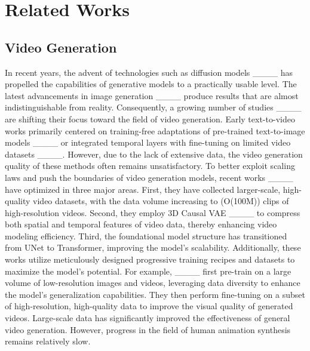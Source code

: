 \section{Related Works}
\subsection{Video Generation}
  In recent years, the advent of technologies such as diffusion models ____ has propelled the capabilities of generative models to a practically usable level. The latest advancements in image generation ____ produce results that are almost indistinguishable from reality. Consequently, a growing number of studies ____ are shifting their focus toward the field of video generation.
  Early text-to-video works primarily centered on training-free adaptations of pre-trained text-to-image models ____ or integrated temporal layers with fine-tuning on limited video datasets ____. However, due to the lack of extensive data, the video generation quality of these methods often remains unsatisfactory. To better exploit scaling laws and push the boundaries of video generation models, recent works ____ have optimized in three major areas. First, they have collected larger-scale, high-quality video datasets, with the data volume increasing to (O(100M)) clips of high-resolution videos. Second, they employ 3D Causal VAE ____ to compress both spatial and temporal features of video data, thereby enhancing video modeling efficiency. Third, the foundational model structure has transitioned from UNet to Transformer, improving the model’s scalability. Additionally, these works utilize meticulously designed progressive training recipes and datasets to maximize the model's potential. For example, ____ first pre-train on a large volume of low-resolution images and videos, leveraging data diversity to enhance the model's generalization capabilities. They then perform fine-tuning on a subset of high-resolution, high-quality data to improve the visual quality of generated videos. Large-scale data has significantly improved the effectiveness of general video generation. However, progress in the field of human animation synthesis remains relatively slow.
  
